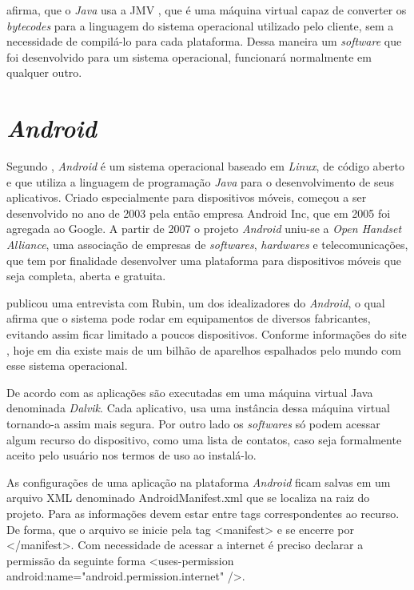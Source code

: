 	\par {} afirma, que o \textit{Java} usa a JMV
, que é uma máquina virtual capaz de converter
os \textit{bytecodes} para a linguagem do sistema operacional utilizado pelo
cliente, sem a necessidade de compilá-lo para cada plataforma. Dessa maneira um
\textit{software} que foi desenvolvido para um sistema operacional, funcionará
normalmente em qualquer outro.

\section{\textit{Android}}

	\par Segundo , \textit{Android} é um sistema
operacional baseado em \textit{Linux}, de código aberto e que utiliza a
linguagem de programação \textit{Java} para o desenvolvimento de seus
aplicativos. Criado especialmente para dispositivos móveis, começou a
ser desenvolvido no ano de 2003 pela então empresa Android Inc, que em 2005 foi
agregada ao Google. A partir de 2007 o projeto \textit{Android} uniu-se a
\textit{Open Handset Alliance}, uma associação de empresas de
\textit{softwares}, \textit{hardwares} e telecomunicações, que tem por
finalidade desenvolver uma plataforma para dispositivos móveis que seja
completa, aberta e gratuita.

	\par {} publicou uma entrevista com Rubin, um dos
idealizadores do \textit{Android}, o qual afirma que o sistema pode rodar em
equipamentos de diversos fabricantes, evitando assim ficar limitado a poucos
dispositivos. Conforme informações do site , hoje em dia
existe mais de um bilhão de aparelhos espalhados pelo mundo com esse sistema
operacional.

	\par De acordo com  as aplicações são executadas em
uma máquina virtual Java denominada \textit{Dalvik}. Cada aplicativo, usa uma
instância dessa máquina virtual tornando-a assim mais segura. Por outro lado os
\textit{softwares} só podem acessar algum recurso do dispositivo, como uma
lista de contatos, caso seja formalmente aceito pelo usuário nos termos de uso
ao instalá-lo.

	\par As configurações de uma aplicação na plataforma \textit{Android} ficam
salvas em um arquivo XML denominado AndroidManifest.xml que se localiza na raiz
do projeto. Para  as informações devem estar entre tags
correspondentes ao recurso. De forma, que o arquivo se inicie pela tag
<manifest> e se encerre por </manifest>. Com necessidade de acessar a internet
é preciso declarar a permissão da seguinte forma <uses-permission
android:name="android.permission.internet" />.

